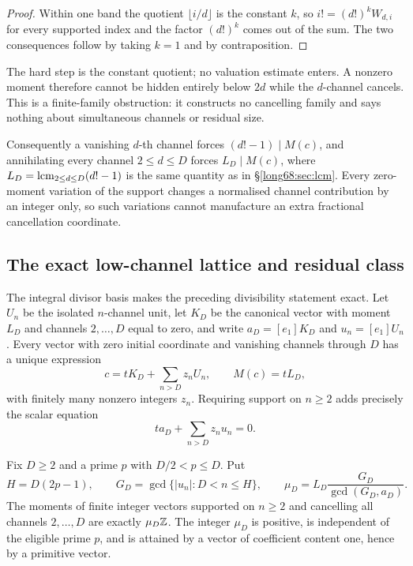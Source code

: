 \documentclass[11pt]{article}
\newcommand{\Lc}{L}
\begin{document}
\begin{proof}
Within one band the quotient $\lfloor i/d\rfloor$ is the constant $k$, so
$i!=(d!)^kW_{d,i}$ for every supported index and the factor $(d!)^k$ comes
out of the sum.  The two consequences follow by taking $k=1$ and by
contraposition.
\end{proof}

\noindent The hard step is the constant quotient; no valuation estimate
enters.  A nonzero moment therefore cannot be hidden entirely below $2d$
while the $d$-channel cancels.  This is a finite-family obstruction: it
constructs no cancelling family and says nothing about simultaneous channels
or residual size.

Consequently a vanishing $d$-th channel forces $(d!-1)\mid M(c)$,
and annihilating every channel $2\le d\le D$ forces $\Lc_D\mid M(c)$, where
$\Lc_D=\lcm_{2\le d\le D}(d!-1)$ is the same quantity as in
\S\ref{long68:sec:lcm}.  Every zero-moment variation of the support changes a
normalised channel contribution by an integer only, so such variations cannot
manufacture an extra fractional cancellation coordinate.

\subsection{The exact low-channel lattice and residual class}

The integral divisor basis makes the preceding divisibility statement exact.
Let $U_n$ be the isolated $n$-channel unit, let $K_D$ be the canonical vector
with moment $L_D$ and channels $2,\ldots,D$ equal to zero, and write
$a_D=[e_1]K_D$ and $u_n=[e_1]U_n$.  Every vector with zero initial coordinate
and vanishing channels through $D$ has a unique expression
\begin{equation}\label{long68:eq:low-channel-basis}
 c=tK_D+\sum_{n>D}z_nU_n,
 \qquad M(c)=tL_D,
\end{equation}
with finitely many nonzero integers $z_n$.  Requiring support on $n\ge2$
adds precisely the scalar equation
\begin{equation}\label{long68:eq:low-channel-support}
 ta_D+\sum_{n>D}z_nu_n=0.
\end{equation}

\begin{theorem}\label{long68:res:moment-ideal}
Fix $D\ge2$ and a prime $p$ with $D/2<p\le D$.  Put
\[
 H=D(2p-1),\qquad
 G_D=\gcd\{|u_n|:D<n\le H\},\qquad
 \mu_D=L_D\frac{G_D}{\gcd(G_D,a_D)}.
\]
The moments of finite integer vectors supported on $n\ge2$ and cancelling all
channels $2,\ldots,D$ are exactly $\mu_D\mathbb{Z}$.  The integer $\mu_D$ is positive,
is independent of the eligible prime $p$, and is attained by a vector of
coefficient content one, hence by a primitive vector.
\end{theorem}
\end{document}
